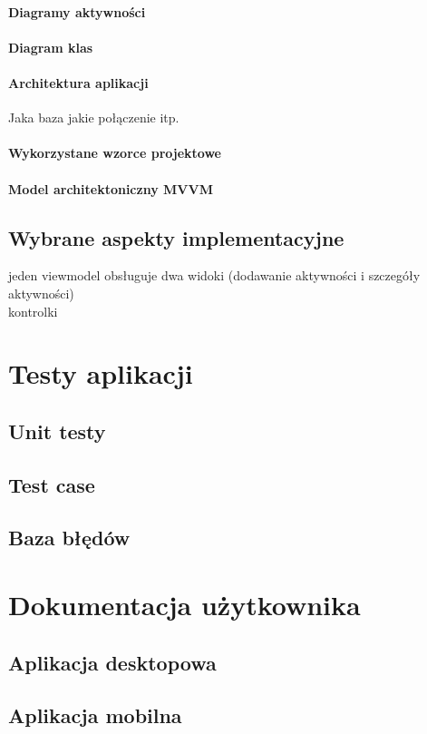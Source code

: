 \documentclass[12pt,twoside]{report}
\begin{document}
\subsubsection{Diagramy aktywności}
\subsubsection{Diagram klas}
\subsubsection{Architektura aplikacji}
Jaka baza jakie połączenie itp.
\subsubsection{Wykorzystane wzorce projektowe}
\subsubsection{Model architektoniczny MVVM}
\section{Wybrane aspekty implementacyjne}
jeden viewmodel obsługuje dwa widoki (dodawanie aktywności i szczegóły aktywności) \\
kontrolki\\
\chapter{Testy aplikacji}
\section{Unit testy}
\section{Test case}
\section{Baza błędów}
\chapter{Dokumentacja użytkownika}
\section{Aplikacja desktopowa}
\section{Aplikacja mobilna}
\end{document}
